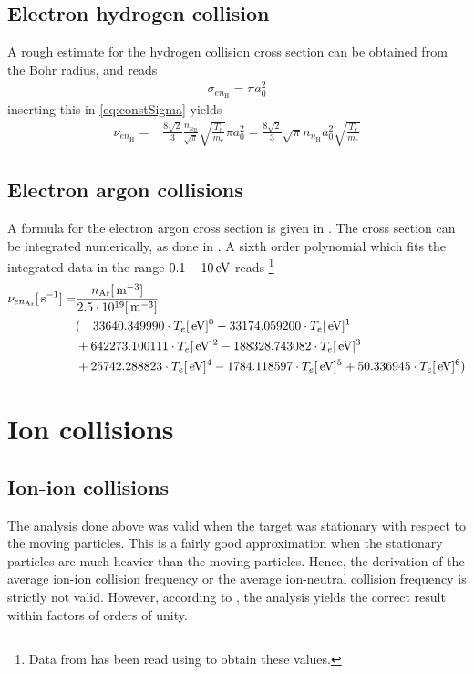 \subsection{Electron hydrogen collision}
A rough estimate for the hydrogen collision cross section can be obtained from the Bohr radius, and reads
%
\begin{align*}
    \sigma_{en_\text{H}} = \pi a_0^2
\end{align*}
%
inserting this in \cref{eq:constSigma} yields
%
\begin{align*}
    \nu_{en_\text{H}}
    =&
    \frac{8\sqrt{2}}{3}
    \frac{n_{n_\text{H}} }{\sqrt{\pi}}
    \sqrt{ \frac{T_e}{m_e}}
    \pi a_0^2
    =
    \frac{8\sqrt{2}}{3}
    \sqrt{\pi} n_{n_\text{H}}  a_0^2
    \sqrt{ \frac{T_e}{m_e}}
\end{align*}
%

\subsection{Electron argon collisions}
%
A formula for the electron argon cross section is given in \cite{Hayashi1981}.
The cross section can be integrated numerically, as done in \cite{Schroder2003Phd}.
A sixth order polynomial which fits the integrated data in the range $0.1 - 10 \, \text{eV}$ reads%
%
\footnote{Data from \cite{Schroder2003Phd} has been read using \cite{Ankit2016Web} to obtain these values.}
%
\begin{align*}
    \nu_{en_\text{Ar}}[\, \text{s}^{-1}]
    =&
    \frac{n_{\text{Ar}}[\, \text{m}^{-3}]}{2.5\cdot10^{19}[\, \text{m}^{-3}]}
    \\
    &
    (
    \quad 33640.349990\cdot T_e[\, \text{eV}]^0 -33174.059200\cdot T_e[\, \text{eV}]^1\\
&+642273.100111\cdot T_e[\, \text{eV}]^2 -188328.743082\cdot T_e[\, \text{eV}]^3\\
&+25742.288823\cdot T_e[\, \text{eV}]^4 -1784.118597\cdot T_e[\, \text{eV}]^5 +50.336945\cdot T_e[\, \text{eV}]^6)
\end{align*}

\section{Ion collisions}
\label{sec:nui}
%
\subsection{Ion-ion collisions}
The analysis done above was valid when the target was stationary with respect to the moving particles.
This is a fairly good approximation when the stationary particles are much heavier than the moving particles.
Hence, the derivation of the average ion-ion collision frequency or the average ion-neutral collision frequency is strictly not valid.
However, according to \cite{Goldston1995book}, the analysis yields the correct result within factors of orders of unity.

